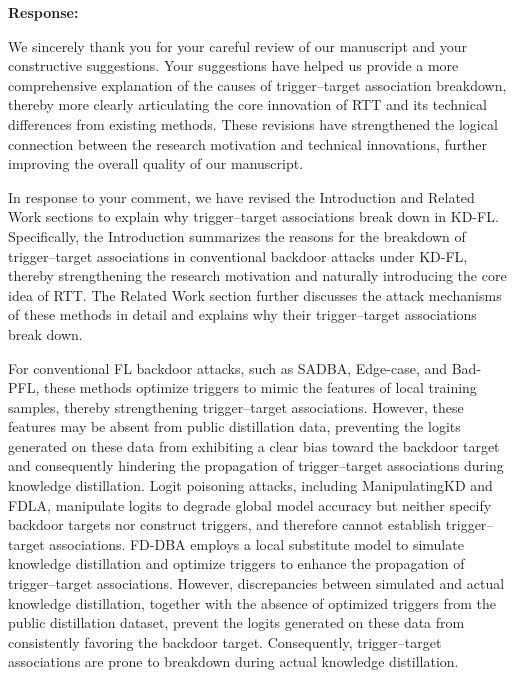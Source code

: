 \documentclass[11pt,a4paper]{article}
\newcommand{\manualindent}{\par\noindent\hspace*{1.5em}\ignorespaces}
\newcommand{\authorresponse}[1]{%
  {\bfseries\color{replyblue}Response:}\par
  #1\par\vspace{0.35em}%
}
\begin{document}
\authorresponse{\manualindent We sincerely thank you for your careful review of our manuscript and your constructive suggestions.
Your suggestions have helped us provide a more comprehensive explanation of the causes of trigger--target association breakdown, thereby more clearly articulating the core innovation of RTT and its technical differences from existing methods.
These revisions have strengthened the logical connection between the research motivation and technical innovations, further improving the overall quality of our manuscript.

\manualindent In response to your comment, we have revised the Introduction and Related Work sections to explain why trigger--target associations break down in KD-FL.
Specifically, the Introduction summarizes the reasons for the breakdown of trigger--target associations in conventional backdoor attacks under KD-FL, thereby strengthening the research motivation and naturally introducing the core idea of RTT.
The Related Work section further discusses the attack mechanisms of these methods in detail and explains why their trigger--target associations break down.

\manualindent For conventional FL backdoor attacks, such as SADBA, Edge-case, and Bad-PFL, these methods optimize triggers to mimic the features of local training samples, thereby strengthening trigger--target associations.
However, these features may be absent from public distillation data, preventing the logits generated on these data from exhibiting a clear bias toward the backdoor target and consequently hindering the propagation of trigger--target associations during knowledge distillation.
Logit poisoning attacks, including ManipulatingKD and FDLA, manipulate logits to degrade global model accuracy but neither specify backdoor targets nor construct triggers, and therefore cannot establish trigger–target associations.
FD-DBA employs a local substitute model to simulate knowledge distillation and optimize triggers to enhance the propagation of trigger--target associations.
However, discrepancies between simulated and actual knowledge distillation, together with the absence of optimized triggers from the public distillation dataset, prevent the logits generated on these data from consistently favoring the backdoor target.
Consequently, trigger--target associations are prone to breakdown during actual knowledge distillation.

}
\end{document}
